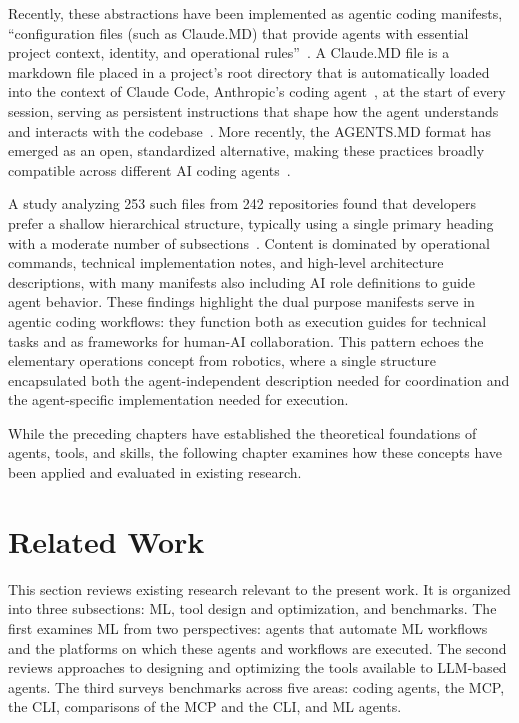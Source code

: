 \documentclass[
english,                 %
bibtex,                  %
includeExtraAbstracts, %
]{kththesis}
\numberwithin{listing}{chapter}
\begin{document}
Recently, these abstractions have been implemented as agentic coding manifests, ``configuration files (such as Claude.\gls{MD}) that provide agents with essential project context, identity, and operational rules''~\cite{scanniello_use_2026}. A Claude.\gls{MD} file is a markdown file placed in a project's root directory that is automatically loaded into the context of Claude Code, Anthropic's coding agent~\cite{anthropic_pbc_claude_2026}, at the start of every session, serving as persistent instructions that shape how the agent understands and interacts with the codebase~\cite{anthropic_pbc_how_2026}. More recently, the AGENTS.\gls{MD} format has emerged as an open, standardized alternative, making these practices broadly compatible across different \gls{AI} coding agents~\cite{lf_projects_llc_agentsmd_2026}.

A study analyzing 253 such files from 242 repositories found that developers prefer a shallow hierarchical structure, typically using a single primary heading with a moderate number of subsections~\cite{scanniello_use_2026}. Content is dominated by operational commands, technical implementation notes, and high-level architecture descriptions, with many manifests also including \gls{AI} role definitions to guide agent behavior. These findings highlight the dual purpose manifests serve in agentic coding workflows: they function both as execution guides for technical tasks and as frameworks for human-\gls{AI} collaboration. This pattern echoes the elementary operations concept from robotics, where a single structure encapsulated both the agent-independent description needed for coordination and the agent-specific implementation needed for execution.

While the preceding chapters have established the theoretical foundations of agents, tools, and skills, the following chapter examines how these concepts have been applied and evaluated in existing research.

\section{Related Work}
\glsresetall

This section reviews existing research relevant to the present work. It is organized into three subsections: \gls{ML}, tool design and optimization, and benchmarks. The first examines \gls{ML} from two perspectives: agents that automate \gls{ML} workflows and the platforms on which these agents and workflows are executed. The second reviews approaches to designing and optimizing the tools available to \gls{LLM}-based agents. The third surveys benchmarks across five areas: coding agents, the \gls{MCP}, the \gls{CLI}, comparisons of the \gls{MCP} and the \gls{CLI}, and \gls{ML} agents.
\end{document}
